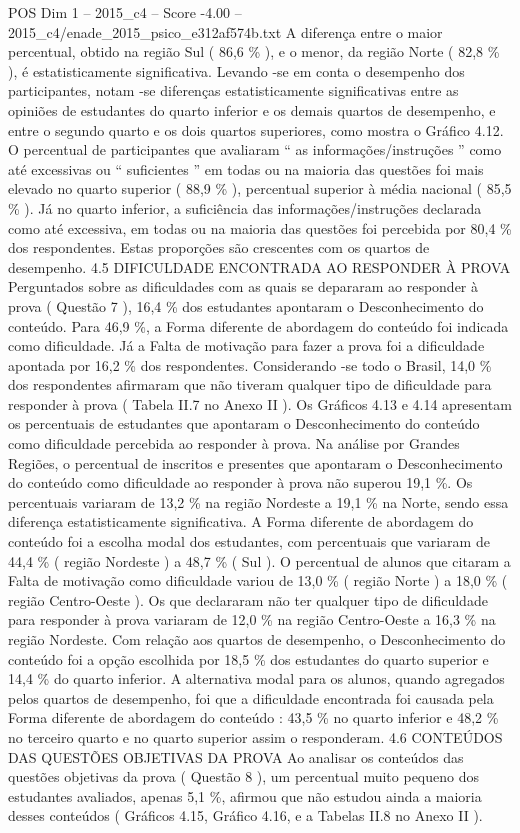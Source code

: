 \begin{textsample}{POS Dim 1 – 2015\_c4 – Score -4.00 – 2015\_c4/enade\_2015\_psico\_e312af574b.txt}
A diferença entre o maior percentual, obtido na região Sul ( 86,6 \% ), e o menor, da região Norte ( 82,8 \% ), é estatisticamente significativa.
Levando -se em conta o desempenho dos participantes, notam -se diferenças estatisticamente significativas entre as opiniões de estudantes do quarto inferior e os demais quartos de desempenho, e entre o segundo quarto e os dois quartos superiores, como mostra o Gráfico 4.12.
O percentual de participantes que avaliaram “ as informações/instruções ” como até excessivas ou “ suficientes ” em todas ou na maioria das questões foi mais elevado no quarto superior ( 88,9 \% ), percentual superior à média nacional ( 85,5 \% ).
Já no quarto inferior, a suficiência das informações/instruções declarada como até excessiva, em todas ou na maioria das questões foi percebida por 80,4 \% dos respondentes.
Estas proporções são crescentes com os quartos de desempenho. 4.5 DIFICULDADE ENCONTRADA AO RESPONDER À PROVA Perguntados sobre as dificuldades com as quais se depararam ao responder à prova ( Questão 7 ), 16,4 \% dos estudantes apontaram o Desconhecimento do conteúdo.
Para 46,9 \%, a Forma diferente de abordagem do conteúdo foi indicada como dificuldade.
Já a Falta de motivação para fazer a prova foi a dificuldade apontada por 16,2 \% dos respondentes.
Considerando -se todo o Brasil, 14,0 \% dos respondentes afirmaram que não tiveram qualquer tipo de dificuldade para responder à prova ( Tabela II.7 no Anexo II ).
Os Gráficos 4.13 e 4.14 apresentam os percentuais de estudantes que apontaram o Desconhecimento do conteúdo como dificuldade percebida ao responder à prova.
Na análise por Grandes Regiões, o percentual de inscritos e presentes que apontaram o Desconhecimento do conteúdo como dificuldade ao responder à prova não superou 19,1 \%.
Os percentuais variaram de 13,2 \% na região Nordeste a 19,1 \% na Norte, sendo essa diferença estatisticamente significativa.
A Forma diferente de abordagem do conteúdo foi a escolha modal dos estudantes, com percentuais que variaram de 44,4 \% ( região Nordeste ) a 48,7 \% ( Sul ).
O percentual de alunos que citaram a Falta de motivação como dificuldade variou de 13,0 \% ( região Norte ) a 18,0 \% ( região Centro-Oeste ).
Os que declararam não ter qualquer tipo de dificuldade para responder à prova variaram de 12,0 \% na região Centro-Oeste a 16,3 \% na região Nordeste.
Com relação aos quartos de desempenho, o Desconhecimento do conteúdo foi a opção escolhida por 18,5 \% dos estudantes do quarto superior e 14,4 \% do quarto inferior.
A alternativa modal para os alunos, quando agregados pelos quartos de desempenho, foi que a dificuldade encontrada foi causada pela Forma diferente de abordagem do conteúdo : 43,5 \% no quarto inferior e 48,2 \% no terceiro quarto e no quarto superior assim o responderam. 4.6 CONTEÚDOS DAS QUESTÕES OBJETIVAS DA PROVA Ao analisar os conteúdos das questões objetivas da prova ( Questão 8 ), um percentual muito pequeno dos estudantes avaliados, apenas 5,1 \%, afirmou que não estudou ainda a maioria desses conteúdos ( Gráficos 4.15, Gráfico 4.16, e a Tabelas II.8 no Anexo II ).

\end{textsample}

